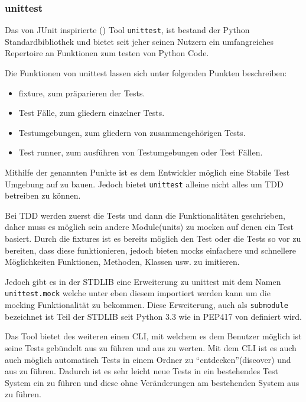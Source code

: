 \subsubsection{unittest}\label{python-tools:unittest}

Das von JUnit inspirierte (\cite{docs.python:unittest}) Tool \lstinline|unittest|, ist bestand
der Python Standardbibliothek und bietet seit jeher seinen Nutzern ein umfangreiches
Repertoire an Funktionen zum testen von Python Code.

Die Funktionen von unittest lassen sich unter folgenden Punkten beschreiben:
\begin{itemize}
    \item \Gls{fixture}, zum präparieren der Tests.
    \item Test Fälle, zum gliedern einzelner Tests.
    \item Testumgebungen, zum gliedern von zusammengehörigen Tests.
    \item Test runner, zum ausführen von Testumgebungen oder Test Fällen.
\end{itemize}

Mithilfe der genannten Punkte ist es dem Entwickler möglich eine Stabile Test Umgebung
auf zu bauen. Jedoch bietet \lstinline{unittest} alleine nicht alles um TDD betreiben zu können.

Bei TDD werden zuerst die Tests und dann die Funktionalitäten geschrieben, daher
muss es möglich sein andere Module(units) zu \gls{mock}en auf denen ein Test basiert.
Durch die \Glspl{fixture} ist es bereits möglich den Test oder die Tests so vor zu
bereiten, dass diese funktionieren, jedoch bieten \Glspl{mock} einfachere und
schnellere Möglichkeiten Funktionen, Methoden, Klassen usw. zu imitieren.

Jedoch gibt es in der STDLIB eine Erweiterung zu unittest mit dem Namen
\lstinline|unittest.mock| welche unter eben diesem importiert werden kann um die 
\gls{mock}ing Funktionalität zu bekommen. Diese Erweiterung, auch als \lstinline|submodule|
bezeichnet ist Teil der STDLIB seit Python 3.3 wie in PEP417 von \cite{python.org:PEP417}
definiert wird.

Das Tool bietet des weiteren einen CLI, mit welchem es dem Benutzer möglich ist
seine Tests gebündelt aus zu führen und aus zu werten. Mit dem CLI ist es auch
auch möglich automatisch Tests in einem Ordner zu "`entdecken"'(discover) und
aus zu führen. Dadurch ist es sehr leicht neue Tests in ein bestehendes Test
System ein zu führen und diese ohne Veränderungen am bestehenden System aus zu
führen.

